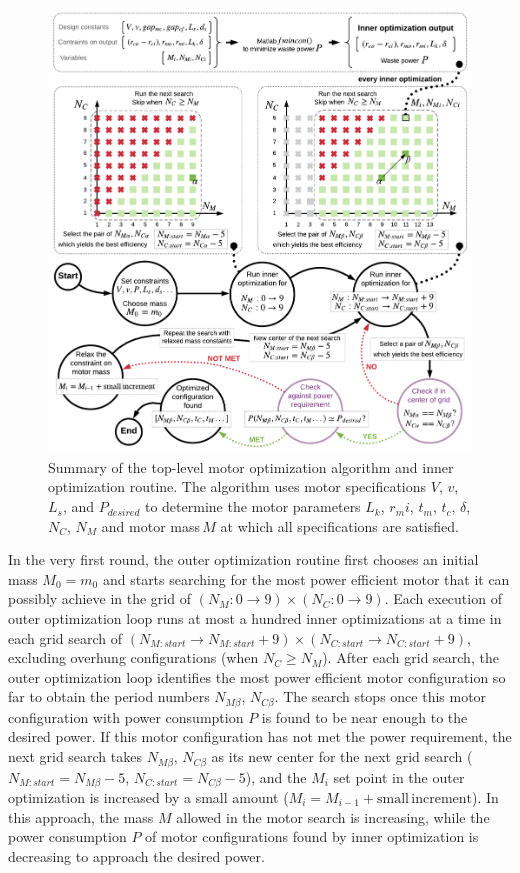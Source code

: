     \begin{figure}[h]
        \centering
        \includegraphics[width=5.8in]{chap5/images/optimization_illustration.pdf}
        \caption{Summary of the top-level motor optimization algorithm and inner optimization routine. The algorithm uses motor specifications $V$, $v$, $L_s$, and $P_{desired}$ to determine the motor parameters $L_k$, $r_mi$, $t_m$, $t_c$, $\delta$, $N_C$, $N_M$ and motor mass\,$M$ at which all specifications are satisfied.}
        \label{fig:chap/experiment/optimization/illustraion of algo}
    \end{figure}
    
    
    In the very first round, the outer optimization routine first chooses an initial mass $M_0 = m_0$ and starts searching for the most power efficient motor that it can possibly achieve in the grid of $(N_M:0\rightarrow9)\times (N_C:0\rightarrow9)$. Each execution of outer optimization loop runs at most a hundred inner optimizations at a time in each grid search of $\left(N_{M:start}\rightarrow N_{M:start}+9\right)\times\left(N_{C:start}\rightarrow N_{C:start}+9\right)$, excluding overhung configurations (when $N_C \geq N_M$). After each grid search, the outer optimization loop identifies the most power efficient motor configuration so far to obtain the period numbers $N_{M\beta}$, $N_{C\beta}$. The search stops once this motor configuration with power consumption $P$ is found to be near enough to the desired power. If this motor configuration has not met the power requirement, the next grid search takes $N_{M\beta}$, $N_{C\beta}$ as its new center for the next grid search ($N_{M:start}=N_{M\beta}-5$, $N_{C:start}=N_{C\beta}-5$), and the $M_i$ set point in the outer optimization is increased by a small amount ($M_i=M_{i-1}+\mathrm{small\,increment}$). In this approach, the mass $M$ allowed in the motor search is increasing, while the power consumption $P$ of motor configurations found by inner optimization is decreasing to approach the desired power. 
    
